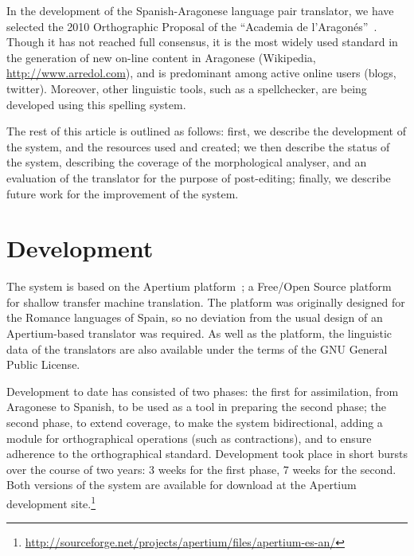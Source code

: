 \documentclass[10pt,a4paper,twocolumn]{article}
\begin{document}
  In the development of the Spanish-Aragonese language pair translator, we have selected the 2010 Orthographic Proposal of the ``Academia de l'Aragonés''~\cite{EFA}. Though it has not reached full consensus, it is the most widely used standard in the generation of new on-line content in Aragonese (Wikipedia, \url{http://www.arredol.com}), and is predominant among active online users (blogs, twitter). Moreover, other linguistic tools, such as a spellchecker, are being developed using this spelling system. %
  
  The rest of this article is outlined as follows: first, we describe the development of the system, and the resources used and created; we then describe the status of the system, describing the coverage of the morphological analyser, and an evaluation of the translator for the purpose of post-editing; finally, we describe future work for the improvement of the system.
  
  \section{Development}
  
  The system is based on the Apertium platform~\cite{Forcada}; a Free/Open Source platform for shallow transfer machine translation. The platform was originally designed for the Romance languages of Spain, so no deviation from the usual design of an Apertium-based translator was required. As well as the platform, the linguistic data of the translators are also available under the terms of the GNU General Public License.
  
  Development to date has consisted of two phases: the first for assimilation, from Aragonese to Spanish, to be used as a tool in preparing the second phase; the second phase, to extend coverage, to make the system bidirectional, adding a module for orthographical operations (such as contractions), and to ensure adherence to the orthographical standard. Development took place in short bursts over the course of two years: 3 weeks for the first phase, 7 weeks for the second. Both versions of the system are available for download at the Apertium development site.\footnote{\url{http://sourceforge.net/projects/apertium/files/apertium-es-an/}}
\end{document}
